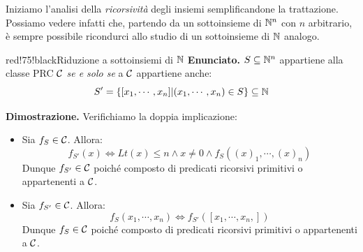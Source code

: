 Iniziamo l'analisi della \textit{ricorsività} degli insiemi semplificandone la trattazione.  Possiamo vedere infatti che, partendo da un sottoinsieme di \(\mathbb{N}^n\) con \(n\) arbitrario, è sempre possibile ricondurci allo studio di un sottoinsieme di \(\mathbb{N}\) analogo.

\begin{halfframedbox}{red!75!black}{Riduzione a sottoinsiemi di \(\mathbb{N}\)}
  \textbf{Enunciato. } \(S \subseteq \mathbb{N}^n\) appartiene alla classe PRC \(\mathcal{C}\) \textit{se e solo se} a \(\mathcal{C}\) appartiene anche:
  \begin{equation}
    S'=\displaystyle{\left\{{[x_1,\cdots, x_n] \vert (x_1,\cdots, x_n) \in S}\right\}}\subseteq \mathbb{N}
  \end{equation}
  \begin{center}
    \textcolor{red!75!black}{\hdashrule[0.5ex]{18cm}{1pt}{3mm 3pt 1mm 2pt}}
  \end{center}

  \textbf{Dimostrazione. } Verifichiamo la doppia implicazione:
  \begin{itemize}
    \item [\(\implies\)] Sia \(f_S \in \mathcal{C}\). Allora:
    \begin{equation}
      f_{S'}(x) \iff Lt(x)\leq n \land x\neq 0 \land f_S({(x)}_1, \cdots, {(x)}_n)
    \end{equation}
    Dunque \(f_{S'} \in \mathcal{C}\) poiché composto di predicati ricorsivi primitivi o appartenenti a \(\mathcal{C}\).
    \item[\(\Longleftarrow\)] Sia \(f_{S'} \in \mathcal{C}\). Allora:
    \begin{equation}
      f_S(x_1, \cdots, x_n) \iff f_{S'}([x_1, \cdots, x_n,])
    \end{equation}
    Dunque \(f_S \in \mathcal{C}\) poiché composto di predicati ricorsivi primitivi o appartenenti a \(\mathcal{C}\).
  \end{itemize}
\end{halfframedbox}
\newpage


